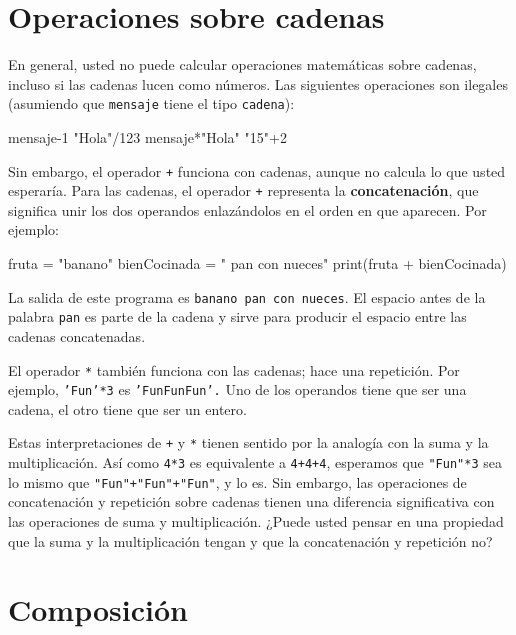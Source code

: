 \section{Operaciones sobre cadenas}


En general, usted no puede calcular operaciones matemáticas sobre
cadenas, incluso si las cadenas lucen como números. Las siguientes
operaciones son ilegales (asumiendo que \texttt{mensaje} tiene el
tipo \texttt{cadena}):

\begin{pyconcode}
 mensaje-1   "Hola"/123   mensaje*"Hola"   "15"+2
\end{pyconcode}

Sin embargo, el operador \texttt{+} funciona con cadenas, aunque no
calcula lo que usted esperaría. Para las cadenas, el operador \texttt{+}
representa la \textbf{concatenación}, que significa unir los dos operandos
enlazándolos en el orden en que aparecen. Por ejemplo:


\begin{pythoncode}
fruta = "banano"
bienCocinada = " pan con nueces"
print(fruta + bienCocinada)
\end{pythoncode}

La salida de este programa es \texttt{banano pan con nueces}. El espacio
antes de la palabra \texttt{pan} es parte de la cadena y sirve para
producir el espacio entre las cadenas concatenadas.

El operador \texttt{{*}} también funciona con las cadenas; hace una
repetición. Por ejemplo, \texttt{'Fun'{*}3} es \texttt{'FunFunFun'.}
Uno de los operandos tiene que ser una cadena, el otro tiene que ser
un entero.

Estas interpretaciones de \texttt{+} y \texttt{{*}} tienen sentido
por la analogía con la suma y la multiplicación. Así como \texttt{4{*}3}
es equivalente a \texttt{4+4+4}, esperamos que \verb+"Fun"*3+ sea
lo mismo que {\verb/"Fun"+"Fun"+"Fun"/}, y lo es. Sin embargo,
las operaciones de concatenación y repetición sobre cadenas tienen
una diferencia significativa con las operaciones de suma y multiplicación.
¿Puede usted pensar en una propiedad que la suma y la multiplicación
tengan y que la concatenación y repetición no?

\section{Composición}

